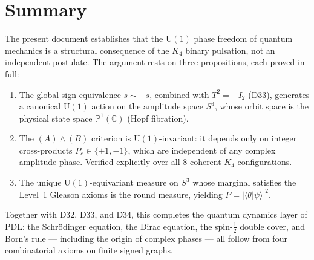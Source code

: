 \documentclass[12pt,a4paper]{article}
\newcommand{\CC}{\mathbb{C}}
\newcommand{\PP}{\mathbb{P}}
\begin{document}
\section{Summary}
\label{sec:summary}

The present document establishes that the $\mathrm{U}(1)$ phase freedom of quantum
mechanics is a structural consequence of the $K_4$ binary pulsation, not an independent
postulate. The argument rests on three propositions, each proved in full:

\begin{enumerate}
\item The global sign equivalence $s \sim -s$, combined with $T^2 = -I_2$ (D33),
      generates a canonical $\mathrm{U}(1)$ action on the amplitude space $S^3$,
      whose orbit space is the physical state space $\PP^1(\CC)$ (Hopf fibration).
\item The $(A)\wedge(B)$ criterion is $\mathrm{U}(1)$-invariant: it depends only on
      integer cross-products $P_c \in \{+1,-1\}$, which are independent of any
      complex amplitude phase. Verified explicitly over all 8 coherent $K_4$
      configurations.
\item The unique $\mathrm{U}(1)$-equivariant measure on $S^3$ whose marginal
      satisfies the Level~1 Gleason axioms is the round measure, yielding
      $P = |\langle\theta|\psi\rangle|^2$.
\end{enumerate}

Together with D32, D33, and D34, this completes the quantum dynamics layer of PDL:
the Schrödinger equation, the Dirac equation, the spin-$\frac{1}{2}$ double cover,
and Born's rule — including the origin of complex phases — all follow from four
combinatorial axioms on finite signed graphs.

\clearpage



\end{document}
